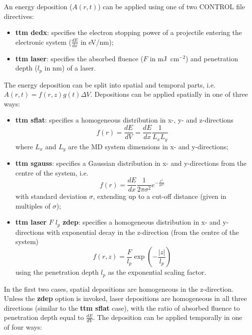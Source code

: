 An energy deposition 
($A(r,t)$) can be applied using one of two CONTROL file directives:
\begin{itemize}
\item {\bf ttm dedx}: specifies the electron stopping power of a projectile entering the electronic system ($\frac{dE}{dx}$ in eV/nm);
\item {\bf ttm laser}: specifies the absorbed fluence ($F$ in mJ~cm$^{-2}$) and penetration depth ($l_p$ in nm) of a laser.
\end{itemize}
The energy deposition can be split into spatial and temporal parts, i.e.
$A(r,t) = f(r,z) g(t) \Delta V$. Depositions can be applied spatially in one of three ways:
\begin{itemize}
\item {\bf ttm sflat}: specifies a homogeneous distribution in x-, y- and z-directions \begin{equation*}f(r) = \frac{dE}{dV} = \frac{dE}{dx} \frac{1}{L_{x} L_{y}}\end{equation*} where $L_{x}$ and $L_{y}$ are the MD system dimensions in x- and y-directions;
\item {\bf ttm sgauss}: specifies a Gaussian distribution in x- and y-directions from the centre of the system, i.e.\begin{equation*}f(r) = \frac{dE}{dx} \frac{1}{2 \pi \sigma^2} e^{-\frac{r^2}{2\sigma^2}}\end{equation*} with standard deviation $\sigma$, extending up to a cut-off distance (given in multiples of $\sigma$);
\item {\bf ttm laser} $F$ $l_p$ {\bf zdep}: specifies a homogeneous distribution in x- and y-directions with exponential decay in the z-direction (from the centre of the system) \begin{equation*}f(r,z) = \frac{F}{l_p} \exp\left(-\frac{|z|}{l_p}\right) \end{equation*} using the penetration depth $l_p$ as the exponential scaling factor.
\end{itemize}
In the first two cases, spatial depositions are homogeneous in the z-direction. 
Unless the {\bf zdep} option is invoked, laser depositions are homogeneous 
in all three directions (similar to the {\bf ttm sflat} case), with the ratio of 
absorbed fluence to penetration depth equal to $\frac{dE}{dV}$.
The deposition can be applied temporally in one of four ways:
